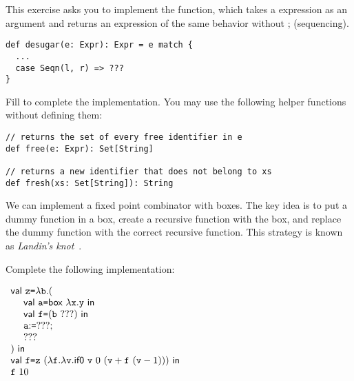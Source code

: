 \begin{exercise}

This exercise asks you to implement the  function, which
takes a \Lang expression as an argument and returns an expression of the same
behavior without \textsf{;} (sequencing).

\begin{verbatim}
def desugar(e: Expr): Expr = e match {
  ...
  case Seqn(l, r) => ???
}
\end{verbatim}

Fill  to complete the implementation.
You may use the following helper functions without defining them:
\begin{verbatim}
// returns the set of every free identifier in e
def free(e: Expr): Set[String]

// returns a new identifier that does not belong to xs
def fresh(xs: Set[String]): String
\end{verbatim}

\end{exercise}

\begin{exercise}

We can implement a fixed point combinator with boxes. The key idea is to put a
dummy function in a box, create a recursive function with the box, and replace
the dummy function with the correct recursive function. This strategy is
known as \textit{Landin's knot}~\cite{landin1964mechanical}.

Complete the following implementation:

$\begin{array}{l}
  \textsf{val}\ \texttt{z}\texttt{=}\lambda\texttt{b}.(\\
  \ \ \ \ \textsf{val}\ \texttt{a}\texttt{=}\textsf{box}\ \lambda\texttt{x}.\texttt{y}\ \textsf{in}\ \\
  \ \ \ \ \textsf{val}\ \texttt{f}\texttt{=}(\texttt{b}\ ???)\ \textsf{in}\ \\
  \ \ \ \ \texttt{a}{:}\texttt{=}???;\\
  \ \ \ \ ???\\
 )\ \textsf{in}\ \\
  \textsf{val}\ \texttt{f}\texttt{=}\texttt{z}\ (\lambda\texttt{f}.\lambda\texttt{v}.\textsf{if0}\ \texttt{v}\ 0\ (\texttt{v}+\texttt{f}\ (\texttt{v}-1)))\ \textsf{in}\ \\
  \texttt{f}\ 10
\end{array}$

\end{exercise}
